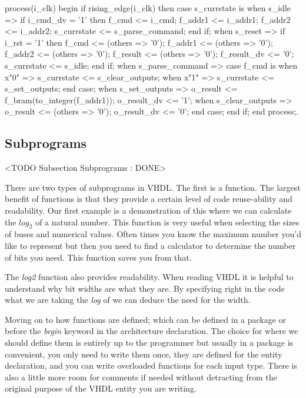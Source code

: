 \begin{VHDLlisting}[tabsize=4]
process(i_clk)
begin
    if rising_edge(i_clk) then
        case s_currstate is
            when s_idle => 
                if i_cmd_dv = '1' then
                    f_cmd    <= i_cmd;
                    f_addr1  <= i_addr1;
                    f_addr2  <= i_addr2;
                    s_currstate <= s_parse_command;
                end if;
            when s_reset => 
                if i_rst = '1' then
                    f_cmd <= (others => '0');
                    f_addr1 <= (others => '0');
                    f_addr2 <= (others => '0');
                    f_result <= (others => '0');
                    f_result_dv <= '0';
                    s_currstate <= s_idle;
                end if;
            when s_parse_command => 
                case f_cmd is 
                    when x"0" => 
  	            	    s_currstate <= s_clear_outputs;
                    when x"1" => 
  	            	    s_currstate <= s_set_outputs;
  	            end case;
            when s_set_outputs => 
				o_result <= f_bram(to_integer(f_addr1));
				o_result_dv <= '1';
            when s_clear_outputs => 
				o_result <= (others => '0');
				o_result_dv <= '0';
        end case;
    end if;
end process;.
\end{VHDLlisting}
 

\subsection{Subprograms}
	<TODO Subsection Subprograms : DONE>

There are two types of subprograms in \ac{VHDL}. The first is a function. The largest benefit of functions is that they provide a certain level of code reuse-ability and readability. Our first example is a demonstration of this where we can calculate the $log_2$ of a natural number. This function is very useful when selecting the sizes of buses and numerical values. Often times you know the maximum number you'd like to represent but then you need to find a calculator to determine the number of bits you need. This function saves you from that. 

The \emph{log2} function also provides readability. When reading \ac{VHDL} it is helpful to understand why bit widths are what they are. By specifying right in the code what we are taking the \emph{log} of we can deduce the need for the width. 

Moving on to how functions are defined; which can be defined in a package or before the \emph{begin} keyword in the architecture declaration. The choice for where we should define them is entirely up to the programmer but usually in a package is convenient, you only need to write them once, they are defined for the entity declaration, and you can write overloaded functions for each input type. There is also a little more room for comments if needed without detracting from the original purpose of the \ac{VHDL} entity you are writing. 
	

